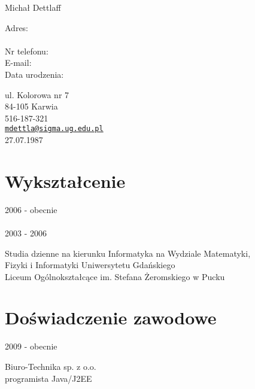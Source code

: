 \documentclass[letterpaper]{article}
\def\name{Michał Dettlaff}
\begin{document}
{\huge \name}


\vspace{0.25in}

\begin{minipage}{0.25\linewidth}
  Adres:\\
  \\
  Nr telefonu:\\
  E-mail:\\
  Data urodzenia:
\end{minipage}
\begin{minipage}{0.50\linewidth}
    ul. Kolorowa nr 7\\
    84-105 Karwia\\
    516-187-321\\
    \href{mailto:mdettla@sigma.ug.edu.pl}{\tt mdettla@sigma.ug.edu.pl}\\
    27.07.1987
\end{minipage}


\section*{Wykształcenie}

\begin{minipage}{0.25\linewidth}
  2006 - obecnie\\
  \\
  2003 - 2006
\end{minipage}
\begin{minipage}{0.65\linewidth}
  Studia dzienne na kierunku Informatyka na Wydziale Matematyki,\\
  Fizyki i Informatyki Uniwersytetu Gdańskiego\\
  Liceum Ogólnokształcące im. Stefana Żeromskiego w Pucku
\end{minipage}


\section*{Doświadczenie zawodowe}

\begin{minipage}{0.25\linewidth}
  2009 - obecnie\\
\end{minipage}
\begin{minipage}{0.65\linewidth}
  Biuro-Technika sp. z o.o.\\
  programista Java/J2EE
\end{minipage}
\end{document}
